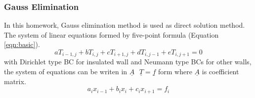 \documentclass[letterpaper,12pt]{article}
\begin{document}
\subsubsection{Gauss Elimination}
In this homework, Gauss elimination method is used as direct solution method. The system of linear
equations formed by five-point formula (Equation \ref{eqn:basic}).
\begin{equation}
	aT_{i-1,j}+bT_{i,j}+cT_{i+1,j}+dT_{i,j-1}+eT_{i,j+1}=0
\end{equation}
with Dirichlet type BC for insulated wall and Neumann type BCs for other walls,
the system of equations can be writen in $\underline{A}\mbox{ }\underline{T}=\underline{f}$ form
where $\underline{A}$ is coefficient matrix.
\begin{equation}
	a_i x_{i-1}+b_i x_i+c_i x_{i+1}=f_i
\end{equation}
\end{document}
